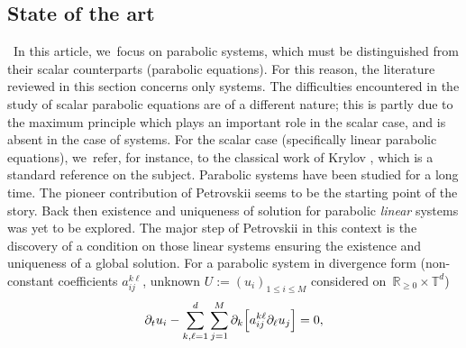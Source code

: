 \documentclass[10pt]{amsart}
\theoremstyle{definition}
\newcommand\R{\mathbb{R}}
\newcommand\T{\mathbb{T}}
\begin{document}
\subsection{State of the art}\label{state of the art}
\
{In this article, we~focus on parabolic systems, which must be distinguished from their scalar counterparts (parabolic equations). For this reason, the literature reviewed in this section concerns only systems. The difficulties encountered in the study of scalar parabolic equations are of a different nature; this is partly due to the maximum principle which plays an important role in the scalar case, and is absent in the case of systems. For the scalar case (specifically linear parabolic equations), we~refer, for instance, to the classical work of Krylov \cite{krylov}, which is a standard reference on the subject.} Parabolic systems have been studied for a long time. The pioneer contribution of Petrovskii \cite{petrorigine} seems to be the starting point of the story. Back then existence and uniqueness of solution for parabolic \emph{linear} systems was yet to be explored. The major step of Petrovskii in this context is the discovery of a condition on those linear systems ensuring the existence and uniqueness of a global solution. For a parabolic system in divergence form (non-constant coefficients $a_{ij}^{k\ell}$, unknown $U:=(u_i)_{1\leq i\leq M}$ considered on~$\R_{\geq 0}\times\T^d$)
\begin{align}\label{eq:u}
\partial_t u_i - \sum_{k,\ell=1}^d \sum_{j=1}^M \partial_k \Bigl[a_{ij}^{k\ell} \partial_\ell u_j \Bigr] = 0,
\end{align}
\end{document}
